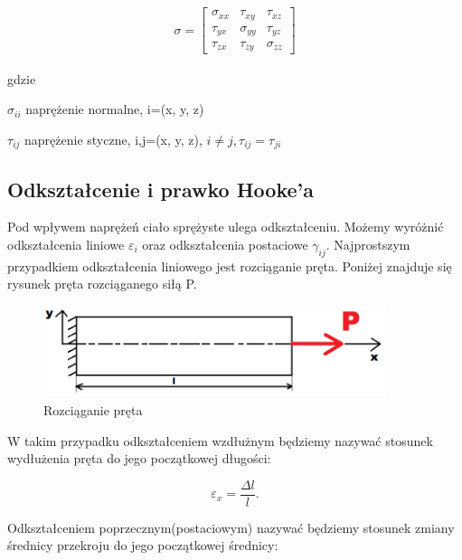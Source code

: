 \begin{gather}
	\sigma=\begin{bmatrix} 
	  \sigma_{xx}    & \tau_{xy} & \tau_{xz} \\ 
	  \tau_{yx} & \sigma_{yy} & \tau_{yz} \\
	  \tau_{zx} & \tau_{zy} & \sigma_{zz} 
	\end{bmatrix}
\end{gather}

gdzie

\begin{eqwhere}[2cm]
        \item[$\sigma_{ii}$] naprężenie normalne, i=(x, y, z)
        \item[$\tau_{ij}$] naprężenie styczne, i,j=(x, y, z), \( i \neq j, \tau_{ij}=\tau_{ji}\)
\end{eqwhere}

\subsection{Odkształcenie i prawko Hooke'a}
\label{sec:odksztalcenie_i_prawo_hookea}

	Pod wpływem naprężeń ciało sprężyste ulega odkształceniu. Możemy wyróżnić odkształcenia liniowe \( \varepsilon_i \) oraz odkształcenia postaciowe \( \gamma_{ij} \). Najprostszym przypadkiem odkształcenia liniowego jest rozciąganie pręta. Poniżej znajduje się rysunek pręta rozciąganego siłą P. 

\begin{figure}[h]
\centering
\includegraphics[width=10cm]{Zdjecia/2/rozciaganie}
\caption{Rozciąganie pręta}
\label{fig:rozciaganie}
\end{figure}

	W takim przypadku odkształceniem wzdłużnym będziemy nazywać stosunek wydłużenia pręta do jego początkowej długości:

\begin{equation}
\varepsilon_x=\frac{\Delta l}{l}.
\end{equation}
	
	Odkształceniem poprzecznym(postaciowym) nazywać będziemy stosunek zmiany średnicy przekroju do jego początkowej średnicy:

